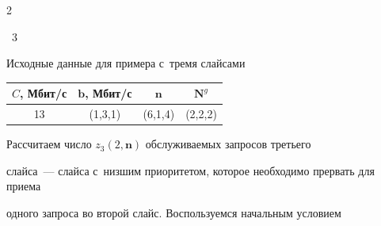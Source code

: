 \begin{multicols}{2}
\pagebreak







\noindent


{{\tablename~3}\ \ \small{Исходные данные для примера с~тремя слайсами


}}







\vspace*{3pt}





\begin{center}


{\small 


\tabcolsep=11pt


\begin{tabular}{|c|c|c|c|}


\hline


$C$, Мбит/с & $\mathbf{b}$, Мбит/с& $\mathbf{n}$ & $\mathbf{N}^g$\\


\hline


13& (1,3,1) & (6,1,4)& (2,2,2)\\


\hline


\end{tabular}


}


\end{center}







\vspace*{6pt}





\addtocounter{table}{1}








Рассчитаем число $z_3\left(2,\mathbf{n}\right)$ об\-слу\-жи\-ва\-емых запросов третьего 


слайса~--- слайса с~низшим приоритетом, которое необходимо прервать для приема 


одного запроса во второй слайс. Воспользуемся начальным условием 



\end{multicols}
